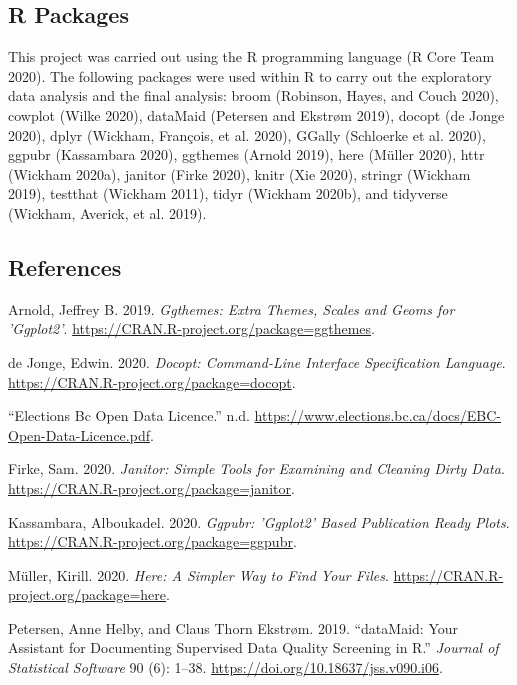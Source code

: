 \documentclass[
]{article}
\begin{document}
\hypertarget{r-packages}{%
\subsection{R Packages}\label{r-packages}}

This project was carried out using the R programming language (R Core
Team 2020). The following packages were used within R to carry out the
exploratory data analysis and the final analysis: broom (Robinson,
Hayes, and Couch 2020), cowplot (Wilke 2020), dataMaid (Petersen and
Ekstrøm 2019), docopt (de Jonge 2020), dplyr (Wickham, François, et al.
2020), GGally (Schloerke et al. 2020), ggpubr (Kassambara 2020),
ggthemes (Arnold 2019), here (Müller 2020), httr (Wickham 2020a),
janitor (Firke 2020), knitr (Xie 2020), stringr (Wickham 2019), testthat
(Wickham 2011), tidyr (Wickham 2020b), and tidyverse (Wickham, Averick,
et al. 2019).

\hypertarget{references}{%
\subsection*{References}\label{references}}

\hypertarget{refs}{}
\leavevmode\hypertarget{ref-ggthemes}{}%
Arnold, Jeffrey B. 2019. \emph{Ggthemes: Extra Themes, Scales and Geoms
for 'Ggplot2'}. \url{https://CRAN.R-project.org/package=ggthemes}.

\leavevmode\hypertarget{ref-docopt}{}%
de Jonge, Edwin. 2020. \emph{Docopt: Command-Line Interface
Specification Language}.
\url{https://CRAN.R-project.org/package=docopt}.

\leavevmode\hypertarget{ref-BC_elections_license}{}%
``Elections Bc Open Data Licence.'' n.d.
\url{https://www.elections.bc.ca/docs/EBC-Open-Data-Licence.pdf}.

\leavevmode\hypertarget{ref-janitor}{}%
Firke, Sam. 2020. \emph{Janitor: Simple Tools for Examining and Cleaning
Dirty Data}. \url{https://CRAN.R-project.org/package=janitor}.

\leavevmode\hypertarget{ref-ggpubr}{}%
Kassambara, Alboukadel. 2020. \emph{Ggpubr: 'Ggplot2' Based Publication
Ready Plots}. \url{https://CRAN.R-project.org/package=ggpubr}.

\leavevmode\hypertarget{ref-here}{}%
Müller, Kirill. 2020. \emph{Here: A Simpler Way to Find Your Files}.
\url{https://CRAN.R-project.org/package=here}.

\leavevmode\hypertarget{ref-dataMaid}{}%
Petersen, Anne Helby, and Claus Thorn Ekstrøm. 2019. ``dataMaid: Your
Assistant for Documenting Supervised Data Quality Screening in R.''
\emph{Journal of Statistical Software} 90 (6): 1--38.
\url{https://doi.org/10.18637/jss.v090.i06}.
\end{document}
